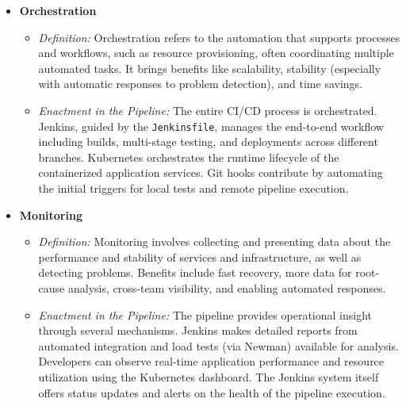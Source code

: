 \begin{itemize}
    \item \textbf{Orchestration}
    \begin{itemize}
        \item \textit{Definition:} Orchestration refers to the automation that supports processes and workflows, such as resource provisioning, often coordinating multiple automated tasks. It brings benefits like scalability, stability (especially with automatic responses to problem detection), and time savings.
        \item \textit{Enactment in the Pipeline:} The entire CI/CD process is orchestrated. Jenkins, guided by the \texttt{Jenkinsfile}, manages the end-to-end workflow including builds, multi-stage testing, and deployments across different branches. Kubernetes orchestrates the runtime lifecycle of the containerized application services. Git hooks contribute by automating the initial triggers for local tests and remote pipeline execution.
    \end{itemize}

    \item \textbf{Monitoring}
    \begin{itemize}
        \item \textit{Definition:} Monitoring involves collecting and presenting data about the performance and stability of services and infrastructure, as well as detecting problems. Benefits include fast recovery, more data for root-cause analysis, cross-team visibility, and enabling automated responses.
        \item \textit{Enactment in the Pipeline:} The pipeline provides operational insight through several mechanisms. Jenkins makes detailed reports from automated integration and load tests (via Newman) available for analysis. Developers can observe real-time application performance and resource utilization using the Kubernetes dashboard. The Jenkins system itself offers status updates and alerts on the health of the pipeline execution.
    \end{itemize}
\end{itemize}